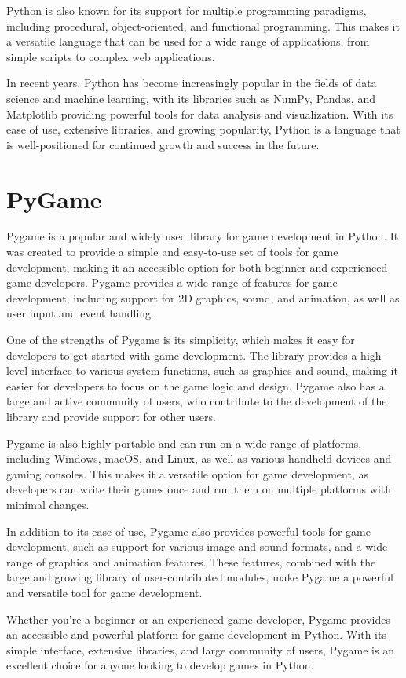 Python is also known for its support for multiple programming paradigms, including procedural, object-oriented, and functional programming. This makes it a versatile language that can be used for a wide range of applications, from simple scripts to complex web applications.

In recent years, Python has become increasingly popular in the fields of data science and machine learning, with its libraries such as NumPy, Pandas, and Matplotlib providing powerful tools for data analysis and visualization. With its ease of use, extensive libraries, and growing popularity, Python is a language that is well-positioned for continued growth and success in the future.
\section{PyGame}
Pygame is a popular and widely used library for game development in Python. It was created to provide a simple and easy-to-use set of tools for game development, making it an accessible option for both beginner and experienced game developers. Pygame provides a wide range of features for game development, including support for 2D graphics, sound, and animation, as well as user input and event handling.

One of the strengths of Pygame is its simplicity, which makes it easy for developers to get started with game development. The library provides a high-level interface to various system functions, such as graphics and sound, making it easier for developers to focus on the game logic and design. Pygame also has a large and active community of users, who contribute to the development of the library and provide support for other users.

Pygame is also highly portable and can run on a wide range of platforms, including Windows, macOS, and Linux, as well as various handheld devices and gaming consoles. This makes it a versatile option for game development, as developers can write their games once and run them on multiple platforms with minimal changes.

In addition to its ease of use, Pygame also provides powerful tools for game development, such as support for various image and sound formats, and a wide range of graphics and animation features. These features, combined with the large and growing library of user-contributed modules, make Pygame a powerful and versatile tool for game development.

Whether you're a beginner or an experienced game developer, Pygame provides an accessible and powerful platform for game development in Python. With its simple interface, extensive libraries, and large community of users, Pygame is an excellent choice for anyone looking to develop games in Python.
